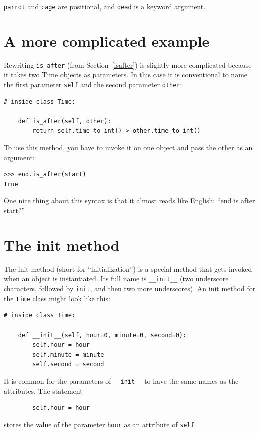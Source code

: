\documentclass[10pt]{book}
\begin{document}
{\tt parrot} and {\tt cage} are positional, and {\tt dead} is
a keyword argument.


\section{A more complicated example}

Rewriting \verb"is_after" (from Section~\ref{isafter}) is slightly
more complicated because it takes two Time objects as parameters.  In
this case it is conventional to name the first parameter {\tt self}
and the second parameter {\tt other}: 

\begin{verbatim}
# inside class Time:

    def is_after(self, other):
        return self.time_to_int() > other.time_to_int()
\end{verbatim}
%
To use this method, you have to invoke it on one object and pass
the other as an argument:

\begin{verbatim}
>>> end.is_after(start)
True
\end{verbatim}
%
One nice thing about this syntax is that it almost reads
like English: ``end is after start?''


\section{The init method}

The init method (short for ``initialization'') is
a special method that gets invoked when an object is instantiated.
Its full name is \verb"__init__" (two underscore characters,
followed by {\tt init}, and then two more underscores).  An
init method for the {\tt Time} class might look like this:

\begin{verbatim}
# inside class Time:

    def __init__(self, hour=0, minute=0, second=0):
        self.hour = hour
        self.minute = minute
        self.second = second
\end{verbatim}
%
It is common for the parameters of \verb"__init__"
to have the same names as the attributes.  The statement

\begin{verbatim}
        self.hour = hour
\end{verbatim}
%
stores the value of the parameter {\tt hour} as an attribute
of {\tt self}.
\end{document}
